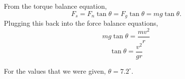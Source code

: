 From the torque balance equation,
$$F_s = F_n\tan\theta = F_g\tan\theta = mg\tan\theta.$$
Plugging this back into the force balance equations,
$$mg\tan\theta = \frac{mv^2}{r}$$
$$\tan\theta = \frac{v^2}{gr}$$

For the values that we were given, $\boxed{\theta = 7.2^\circ}$.











